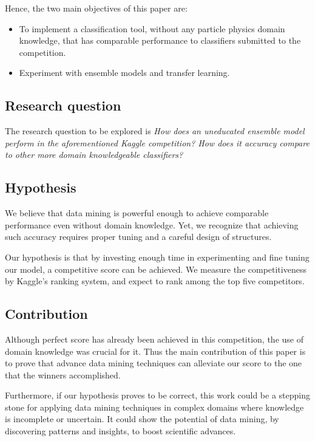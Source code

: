 \documentclass[conference]{IEEEtran}
\begin{document}
Hence, the two main objectives of this paper are:

\begin{itemize}
	\item To implement a classification tool, without any particle physics domain knowledge, that has comparable performance to classifiers submitted to the competition.
	\item Experiment with ensemble models and transfer learning.
\end{itemize}

\subsection{Research question}
\label{sec:researchQuestions}
The research question to be explored is \textit{How does an uneducated ensemble model perform in the aforementioned Kaggle competition? How does it accuracy compare to other more domain knowledgeable classifiers?}

\subsection{Hypothesis}
\label{sec:hypothesis}
We believe that data mining is powerful enough to achieve comparable performance even without domain knowledge. Yet, we recognize that achieving such accuracy requires proper tuning and a careful design of structures.

Our hypothesis is that by investing enough time in experimenting and fine tuning our model, a competitive score can be achieved. We measure the competitiveness by Kaggle's ranking system, and expect to rank among the top five competitors.

\subsection{Contribution}
Although perfect score has already been achieved in this competition, the use of domain knowledge was crucial for it. Thus the main contribution of this paper is to prove that advance data mining techniques can alleviate our score to the one that the winners accomplished.

Furthermore, if our hypothesis proves to be correct, this work could be a stepping stone for applying data mining techniques in complex domains where knowledge is incomplete or uncertain. It could show the potential of data mining, by discovering patterns and insights, to boost scientific advances.
\end{document}
